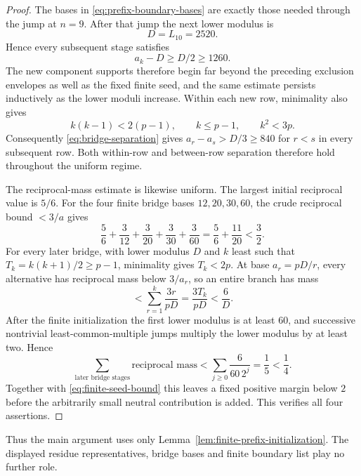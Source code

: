 \begin{proof}
The bases in \eqref{eq:prefix-boundary-bases} are exactly those needed through the jump at $n=9$.  After that jump the next lower modulus is
\[
D=L_{10}=2520.
\]
Hence every subsequent stage satisfies
\[
a_k-D\ge D/2\ge1260.
\]
The new component supports therefore begin far beyond the preceding exclusion envelopes as well as the fixed finite seed, and the same estimate persists inductively as the lower moduli increase.  Within each new row, minimality also gives
\[
k(k-1)<2(p-1),\qquad k\le p-1,
\qquad k^2<3p.
\]
Consequently \eqref{eq:bridge-separation} gives $a_r-a_s>D/3\ge840$ for $r<s$ in every subsequent row.  Both within-row and between-row separation therefore hold throughout the uniform regime.

The reciprocal-mass estimate is likewise uniform.  The largest initial reciprocal value is $5/6$.  For the four finite bridge bases $12,20,30,60$, the crude reciprocal bound $<3/a$ gives
\begin{equation}\label{eq:finite-seed-bound}
\frac56+\frac3{12}+\frac3{20}+\frac3{30}+\frac3{60}
=\frac56+\frac{11}{20}<\frac32.
\end{equation}
For every later bridge, with lower modulus $D$ and $k$ least such that $T_k=k(k+1)/2\ge p-1$, minimality gives $T_k<2p$.  At base $a_r=pD/r$, every alternative has reciprocal mass below $3/a_r$, so an entire branch has mass
\begin{equation}\label{eq:future-row-bound}
<\sum_{r=1}^k\frac{3r}{pD}
=\frac{3T_k}{pD}
<\frac6D.
\end{equation}
After the finite initialization the first lower modulus is at least $60$, and successive nontrivial least-common-multiple jumps multiply the lower modulus by at least two.  Hence
\begin{equation}\label{eq:future-bridge-total}
\sum_{\text{later bridge stages}}\text{reciprocal mass}
<\sum_{j\ge0}\frac6{60\,2^j}
=\frac15<\frac14.
\end{equation}
Together with \eqref{eq:finite-seed-bound} this leaves a fixed positive margin below $2$ before the arbitrarily small neutral contribution is added.  This verifies all four assertions.
\end{proof}

Thus the main argument uses only Lemma~\ref{lem:finite-prefix-initialization}.  The displayed residue representatives, bridge bases and finite boundary list play no further role.

